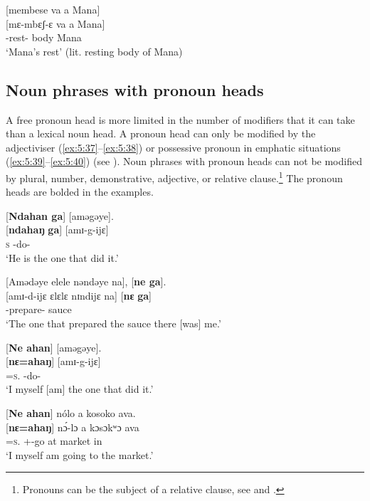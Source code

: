 \ea \label{ex:5:36}
{} [membese va  a  Mana]\\
\gll  {}[mɛ-mbɛʃ-ɛ     va   a   Mana]\\
      \NOM-rest-{\CL}    body   {\GEN}  Mana\\
\glt  ‘Mana’s rest’ (lit. resting body of Mana)
\z

\subsection{Noun phrases with pronoun heads}\label{sec:5.2.2}
\hypertarget{RefHeading1211641525720847}{}
A free pronoun head is more limited in the number of modifiers that it can take than a lexical noun head. A pronoun head can only be modified by the adjectiviser (\ref{ex:5:37}--\ref{ex:5:38}) or possessive pronoun in emphatic situations (\ref{ex:5:39}--\ref{ex:5:40}) (see ). Noun phrases with pronoun heads can not be modified by plural, number, demonstrative, adjective, or relative clause.\footnote{Pronouns can be the subject of a relative clause, see  and .} The pronoun heads are bolded in the examples. 

\ea \label{ex:5:37}
{}[\textbf{Ndahan  ga}]  [aməgəye].\\
\gll  {}[\textbf{ndahaŋ}  \textbf{ga}]  [amɪ-g-ijɛ]\\
      \textsc{s}    {\ADJ}  {\DEP}-do-{\CL}\\
\glt  ‘He is the one that did it.’ 
\z

\ea \label{ex:5:38}
{}[Amədəye  elele  nəndəye  na],  [\textbf{ne  ga}].\\
\gll  {}[amɪ-d-ijɛ    ɛlɛlɛ  nɪndijɛ  na]  [\textbf{nɛ}  \textbf{ga}]\\
      {\DEP}-prepare{}-{\CL}  sauce  {\DEM}  {\PSP}  {\oneS}  {\ADJ}\\
\glt  ‘The one that prepared the sauce there [was] me.’
\z

\ea \label{ex:5:39}
{}[\textbf{Ne  ahan}]  [aməgəye].\\
\gll  {}[\textbf{nɛ}\textbf{=ahaŋ}]    [amɪ-g-ijɛ]\\
      {\oneS}=\textsc{s}.{\POSS}  {\DEP}-do-{\CL}\\
\glt  ‘I myself [am] the one that did it.’ 
\z

\clearpage
\ea \label{ex:5:40}
{}[\textbf{Ne  ahan}]  nólo  a  kosoko  ava.\\
\gll  {}[\textbf{nɛ}\textbf{=ahaŋ}]    n\'{ɔ}-lɔ    a  kɔsɔkʷɔ  ava\\
      {\oneS}=\textsc{s}.{\POSS}  {\oneS}+{\IFV}-go  at  market  in\\
\glt  ‘I myself am going to the market.’
\z

